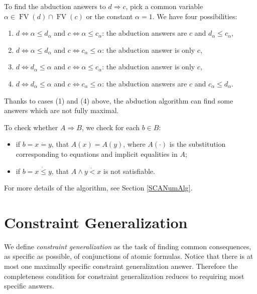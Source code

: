 \documentclass{article}
\newcommand{\cdummy}{\cdot}
\newcommand{\tmem}[1]{{\em #1\/}}
\newcommand{\tmop}[1]{\ensuremath{\operatorname{#1}}}
\begin{document}
To find the abduction answers to $d \Rightarrow c$, pick a common variable
$\alpha \in \tmop{FV} (d) \cap \tmop{FV} (c)$ or the constant $\alpha = 1$. We
have four possibilities:
\begin{enumerate}
  \item $d \Leftrightarrow \alpha \leqslant d_{\alpha}$ and $c \Leftrightarrow
  \alpha \leqslant c_{\alpha}$: the abduction answers are $c$ and $d_{\alpha}
  \leqslant c_{\alpha}$,
  
  \item $d \Leftrightarrow \alpha \leqslant d_{\alpha}$ and $c \Leftrightarrow
  c_{\alpha} \leqslant \alpha$: the abduction answer is only $c$,
  
  \item $d \Leftrightarrow d_{\alpha} \leqslant \alpha$ and $c \Leftrightarrow
  \alpha \leqslant c_{\alpha}$: the abduction answer is only $c$,
  
  \item $d \Leftrightarrow d_{\alpha} \leqslant \alpha$ and $c \Leftrightarrow
  c_{\alpha} \leqslant \alpha$: the abduction answers are $c$ and $c_{\alpha}
  \leqslant d_{\alpha}$.
\end{enumerate}
Thanks to cases (1) and (4) above, the abduction algorithm can find some
answers which are not fully maximal.

To check whether $A \Rightarrow B$, we check for each $b \in B$:
\begin{itemize}
  \item if $b = x \dot{=} y$, that $A (x) = A (y)$, where $A (\cdummy)$ is the
  substitution corresponding to equations and implicit equalities in $A$;
  
  \item if $b = x \dot{\leqslant} y$, that $A \wedge y \dot{<} x$ is not
  satisfiable.
\end{itemize}
For more details of the algorithm, see Section \ref{SCANumAlg}.

\section{Constraint Generalization}\label{ConstrnGenMain}

We define {\tmem{constraint generalization}} as the task of finding common
consequences, as specific as possible, of conjunctions of atomic formulas.
Notice that there is at most one maximally specific constraint generalization
answer. Therefore the completeness condition for constraint generalization
reduces to requiring most specific answers.
\end{document}
